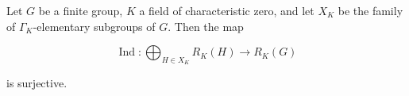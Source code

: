 Let $G$ be a finite group, $K$ a field of characteristic zero, and let $X_K$ be the family of $\Gamma_K$-elementary subgroups of $G$. Then the map

$$\operatorname{Ind} : \bigoplus_{H \in X_K} R_K(H) \rightarrow R_K(G)$$

is surjective.
